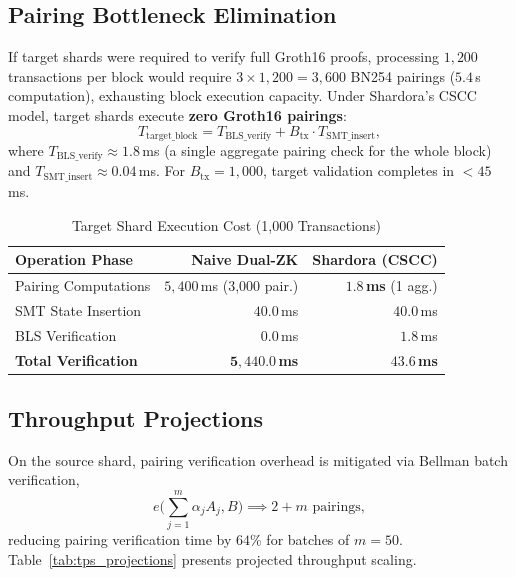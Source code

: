 \documentclass[sigconf,nonacm]{acmart}
\begin{document}
\subsection{Pairing Bottleneck Elimination}
If target shards were required to verify full Groth16 proofs, processing $1{,}200$ transactions per block would require $3 \times 1{,}200 = 3{,}600$ BN254 pairings ($5.4$\,s computation), exhausting block execution capacity. Under Shardora's CSCC model, target shards execute \textbf{zero Groth16 pairings}:
\begin{equation}
T_{\text{target\_block}} = T_{\text{BLS\_verify}} + B_{\text{tx}} \cdot T_{\text{SMT\_insert}},
\end{equation}
where $T_{\text{BLS\_verify}} \approx 1.8$\,ms (a single aggregate pairing check for the whole block) and $T_{\text{SMT\_insert}} \approx 0.04$\,ms. For $B_{\text{tx}} = 1{,}000$, target validation completes in $< 45$\,ms.

\begin{table}[H]
\centering
\caption{Target Shard Execution Cost (1,000 Transactions)}
\label{tab:target_cost}
\small
\begin{tabular}{lrr}
\toprule
\textbf{Operation Phase} & \textbf{Naive Dual-ZK} & \textbf{Shardora (CSCC)} \\
\midrule
Pairing Computations & $5{,}400$\,ms (3{,}000 pair.) & $\mathbf{1.8}$\,\textbf{ms} (1 agg.) \\
SMT State Insertion & $40.0$\,ms & $40.0$\,ms \\
BLS Verification & $0.0$\,ms & $1.8$\,ms \\
\midrule
\textbf{Total Verification} & $\mathbf{5{,}440.0}$\,\textbf{ms} & $\mathbf{43.6}$\,\textbf{ms} \\
\bottomrule
\end{tabular}
\end{table}

\subsection{Throughput Projections}
On the source shard, pairing verification overhead is mitigated via Bellman batch verification,
\begin{equation}
e\Big(\sum_{j=1}^m \alpha_j A_j, B\Big) \implies 2 + m \text{ pairings},
\end{equation}
reducing pairing verification time by $64\%$ for batches of $m = 50$. Table~\ref{tab:tps_projections} presents projected throughput scaling.
\end{document}
